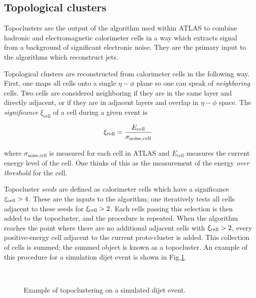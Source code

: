 \subsection{Topological clusters}\label{sec:topoclusters}

Topoclusters are the output of the algorithm used within ATLAS to combine hadronic and electromagnetic calorimeter cells in a way which extracts signal from a background of significant electronic noise\cite{PERF-2014-07}.
They are the primary input to the algorithms which reconstruct jets.

Topological clusters are reconstructed from calorimeter cells in the following way.
First, one maps all cells onto a single $\eta-\phi$ plane so one can speak of \textit{neighboring} cells.
Two cells are considered neighboring if they are in the same layer and directly adjacent, or if they are in adjacent layers and overlap in $\eta-\phi$ space.
The \textit{significance} $\xi_{\text{cell}}$ of a cell during a given event is

\begin{equation}
\xi_{\text{cell}} = \frac{E_{\text{cell}}}{\sigma_{\text{noise,cell}}}
\end{equation}

where $\sigma_{\text{noise,cell}}$ is measured for each cell in ATLAS and $E_{\text{cell}}$ measures the current energy level of the cell.
One thinks of this as the measurement of the energy \textit{over threshold} for the cell.

Topocluster \textit{seeds} are defined as calorimeter cells which have a significance $\xi_{\text{cell}} > 4 $.
These are the inputs to the algorithm; one iteratively tests all cells adjacent to these seeds for $\xi_{\text{cell}} > 2$.
Each cells passing this selection is then added to the topocluster, and the procedure is repeated.
When the algorithm reaches the point where there are no additional adjacent cells with $\xi_{\text{cell}} > 2$, every positive-energy cell adjacent to the current proto-cluster is added.
This collection of cells is summed; the summed object is known as a topocluster.
An example of this procedure for a simulation dijet event is shown in Fig.\ref{fig:topocluster}.
\begin{figure}
\caption{Example of topoclustering on a simulated dijet event.} \label{fig:topocluster}
 \\
\end{figure}

